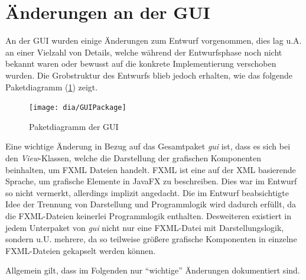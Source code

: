 \section{Änderungen an der GUI}
An der GUI wurden einige Änderungen zum Entwurf vorgenommen, dies lag u.A. an einer Vielzahl von Details, welche während der Entwurfsphase noch nicht bekannt waren oder bewusst auf die konkrete Implementierung verschoben wurden. 
Die Grobstruktur des Entwurfs blieb jedoch erhalten, wie das folgende Paketdiagramm (\ref{fig:GUI}) zeigt.
\begin{figure}[h!]
	\centering
	\texttt{[image: dia/GUIPackage]}
	\caption{Paketdiagramm der GUI}
	\label{fig:GUI}
\end{figure}

Eine wichtige Änderung in Bezug auf das Gesamtpaket \emph{gui} ist, dass es sich bei den \emph{View}-Klassen, welche die Darstellung der grafischen Komponenten beinhalten, um FXML Dateien handelt. FXML ist eine auf der  XML basierende Sprache, um grafische Elemente in JavaFX zu beschreiben. Dies war im Entwurf so nicht vermerkt, allerdings implizit angedacht. Die im Entwurf beabsichtigte Idee der Trennung von Darstellung und Programmlogik wird dadurch erfüllt, da die FXML-Dateien keinerlei Programmlogik enthalten. Desweiteren existiert in jedem Unterpaket von \emph{gui} nicht nur eine FXML-Datei mit Darstellungslogik, sondern u.U. mehrere, da so teilweise größere grafische Komponenten in einzelne FXML-Dateien gekapselt werden können.
	
Allgemein gilt, dass im Folgenden nur "`wichtige"' Änderungen dokumentiert sind.

